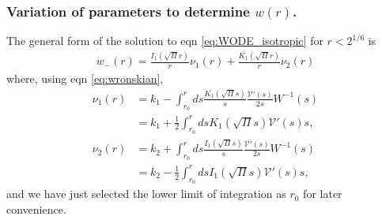 \documentclass[twocolumn,amsmath,amssymb,aps]{revtex4-1}%
\begin{document}
\subsubsection{Variation of parameters to determine $w(r)$.}
The general form of the solution to eqn \ref{eq:WODE_isotropic} for
$r<2^{1/6}$ is
\begin{align}
  w_{-}(r) = \frac{I_1(\sqrt{\Pi}r)}{r}\nu_1(r)
  +\frac{K_1(\sqrt{\Pi}r)}{r}\nu_2(r)
\end{align}
where, using eqn \ref{eq:wronskian},
\begin{subequations}
  \label{eqs:ODEcoefficientsVOP}
  \begin{align}
    \nu_1(r)
    &= k_1 - \int_{r_0}^rds\frac{K_1(\sqrt{\Pi}s)}{s}
      \frac{\mathcal{V}'(s)}{2s}W^{-1}(s)\nonumber\\
    &= k_1 + \frac{1}{2}\int_{r_0}^rdsK_1(\sqrt{\Pi}s)
      \mathcal{V}'(s)s,\nonumber\\
    \nu_2(r)
    &= k_2 + \int_{r_0}^rds\frac{I_1(\sqrt{\Pi}s)}{s}
      \frac{\mathcal{V}'(s)}{2s}W^{-1}(s)\nonumber\\
    &= k_2 - \frac{1}{2}\int_{r_0}^rdsI_1(\sqrt{\Pi}s)
      \mathcal{V}'(s)s,
  \end{align}
\end{subequations}
and we have just selected the lower limit of integration as $r_0$ for later
convenience.
\end{document}
